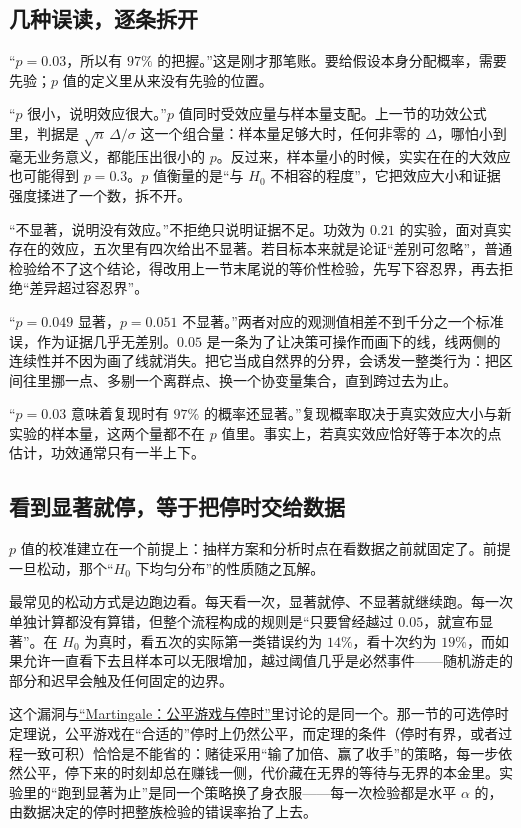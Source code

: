 \subsection{几种误读，逐条拆开}

``\(p=0.03\)，所以有 \(97\%\) 的把握。''这是刚才那笔账。要给假设本身分配概率，需要先验；\(p\) 值的定义里从来没有先验的位置。

``\(p\) 很小，说明效应很大。''\(p\) 值同时受效应量与样本量支配。上一节的功效公式里，判据是 \(\sqrt n\,\Delta/\sigma\) 这一个组合量：样本量足够大时，任何非零的 \(\Delta\)，哪怕小到毫无业务意义，都能压出很小的 \(p\)。反过来，样本量小的时候，实实在在的大效应也可能得到 \(p=0.3\)。\(p\) 值衡量的是``与 \(H_0\) 不相容的程度''，它把效应大小和证据强度揉进了一个数，拆不开。

``不显著，说明没有效应。''不拒绝只说明证据不足。功效为 \(0.21\) 的实验，面对真实存在的效应，五次里有四次给出不显著。若目标本来就是论证``差别可忽略''，普通检验给不了这个结论，得改用上一节末尾说的等价性检验，先写下容忍界，再去拒绝``差异超过容忍界''。

``\(p=0.049\) 显著，\(p=0.051\) 不显著。''两者对应的观测值相差不到千分之一个标准误，作为证据几乎无差别。\(0.05\) 是一条为了让决策可操作而画下的线，线两侧的连续性并不因为画了线就消失。把它当成自然界的分界，会诱发一整类行为：把区间往里挪一点、多剔一个离群点、换一个协变量集合，直到跨过去为止。

``\(p=0.03\) 意味着复现时有 \(97\%\) 的概率还显著。''复现概率取决于真实效应大小与新实验的样本量，这两个量都不在 \(p\) 值里。事实上，若真实效应恰好等于本次的点估计，功效通常只有一半上下。

\subsection{看到显著就停，等于把停时交给数据}

\(p\) 值的校准建立在一个前提上：抽样方案和分析时点在看数据之前就固定了。前提一旦松动，那个``\(H_0\) 下均匀分布''的性质随之瓦解。

最常见的松动方式是边跑边看。每天看一次，显著就停、不显著就继续跑。每一次单独计算都没有算错，但整个流程构成的规则是``只要曾经越过 \(0.05\)，就宣布显著''。在 \(H_0\) 为真时，看五次的实际第一类错误约为 \(14\%\)，看十次约为 \(19\%\)，而如果允许一直看下去且样本可以无限增加，越过阈值几乎是必然事件——随机游走的部分和迟早会触及任何固定的边界。

这个漏洞与\hyperref[sec:06-Random-Processes/04-Applications/02]{``Martingale：公平游戏与停时''}里讨论的是同一个。那一节的可选停时定理说，公平游戏在``合适的''停时上仍然公平，而定理的条件（停时有界，或者过程一致可积）恰恰是不能省的：赌徒采用``输了加倍、赢了收手''的策略，每一步依然公平，停下来的时刻却总在赚钱一侧，代价藏在无界的等待与无界的本金里。实验里的``跑到显著为止''是同一个策略换了身衣服——每一次检验都是水平 \(\alpha\) 的，由数据决定的停时把整族检验的错误率抬了上去。

